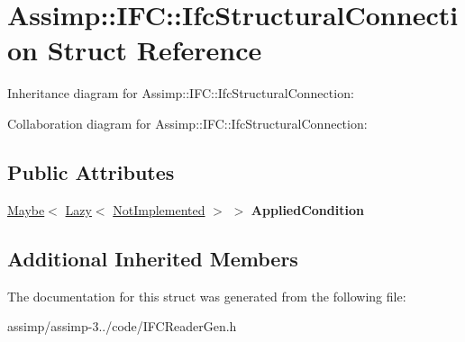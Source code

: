 \hypertarget{struct_assimp_1_1_i_f_c_1_1_ifc_structural_connection}{\section{Assimp\+:\+:I\+F\+C\+:\+:Ifc\+Structural\+Connection Struct Reference}
\label{struct_assimp_1_1_i_f_c_1_1_ifc_structural_connection}
}


Inheritance diagram for Assimp\+:\+:I\+F\+C\+:\+:Ifc\+Structural\+Connection\+:


Collaboration diagram for Assimp\+:\+:I\+F\+C\+:\+:Ifc\+Structural\+Connection\+:
\subsection*{Public Attributes}
\begin{DoxyCompactItemize}
\item 
\hypertarget{struct_assimp_1_1_i_f_c_1_1_ifc_structural_connection_ae20c8d2c2c161d564ab0035a5f7fc66d}{\hyperlink{struct_assimp_1_1_s_t_e_p_1_1_maybe}{Maybe}$<$ \hyperlink{struct_assimp_1_1_s_t_e_p_1_1_lazy}{Lazy}$<$ \hyperlink{struct_assimp_1_1_i_f_c_1_1_not_implemented}{Not\+Implemented} $>$ $>$ {\bfseries Applied\+Condition}}\label{struct_assimp_1_1_i_f_c_1_1_ifc_structural_connection_ae20c8d2c2c161d564ab0035a5f7fc66d}

\end{DoxyCompactItemize}
\subsection*{Additional Inherited Members}


The documentation for this struct was generated from the following file\+:\begin{DoxyCompactItemize}
\item 
assimp/assimp-\/3../code/I\+F\+C\+Reader\+Gen.\+h\end{DoxyCompactItemize}
